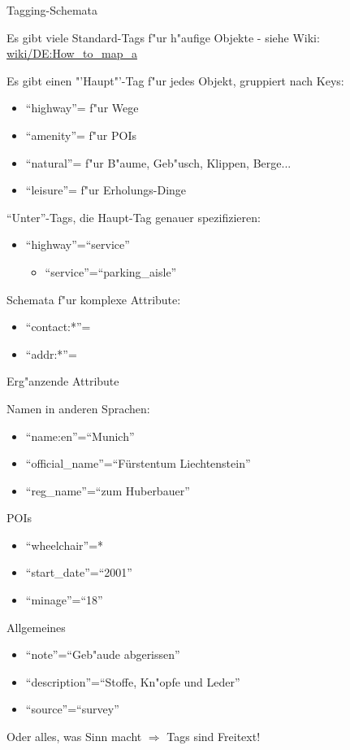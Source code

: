 \documentclass{beamer}
\begin{document}
\begin{frame}{Tagging-Schemata}
  
Es gibt viele Standard-Tags f"ur h"aufige Objekte - siehe Wiki: \href{http://wiki.openstreetmap.org/wiki/DE:How\_to\_map\_a}{wiki/DE:How\_to\_map\_a}

Es gibt einen "'Haupt"'-Tag f"ur jedes Objekt, gruppiert nach Keys:
\begin{itemize}
	\item ``highway''= f"ur Wege
	\item ``amenity''= f"ur POIs
	\item ``natural''= f"ur B"aume, Geb"usch, Klippen, Berge...
	\item ``leisure''= f"ur Erholungs-Dinge
\end{itemize}

"`Unter"'-Tags, die Haupt-Tag genauer spezifizieren:
\begin{itemize}
        \item ``highway''=``service''
	\begin{itemize}
               \item ``service''=``parking\_aisle''
	\end{itemize}
\end{itemize}

Schemata f"ur komplexe Attribute:
\begin{itemize}
        \item ``contact:*''=
	\item ``addr:*''=
\end{itemize}

\end{frame}

\begin{frame}{Erg"anzende Attribute}

Namen in anderen Sprachen:
\begin{itemize}
        \item ``name:en''=``Munich''
	\item ``official\_name''=``Fürstentum Liechtenstein''
	\item ``reg\_name''=``zum Huberbauer''
\end{itemize}

POIs

\begin{itemize}
		        \item ``wheelchair''=*
			\item ``start\_date''=``2001''
			\item ``minage''=``18''
\end{itemize}

Allgemeines
\begin{itemize}
	\item ``note''=``Geb"aude abgerissen''
	\item ``description''=``Stoffe, Kn"opfe und Leder''
	\item ``source''=``survey''
\end{itemize}


Oder alles, was Sinn macht $\Rightarrow$ Tags sind Freitext!

\end{frame}
\end{document}
